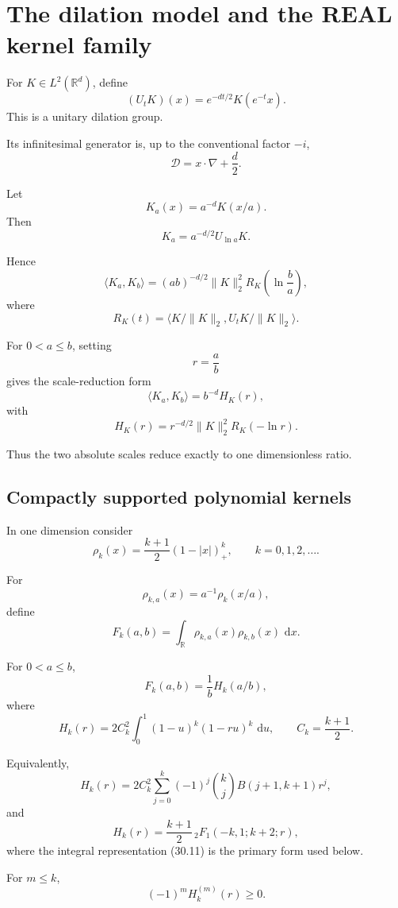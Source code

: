 \documentclass[11pt,a4paper]{article}
\newcommand{\R}{\mathbb R}
\newcommand{\1}{\mathbf 1}
\newcommand{\dd}{\,\mathrm d}
\newcommand{\ip}[2]{\langle #1,#2\rangle}
\begin{document}
\section{The dilation model and the REAL kernel family}

For \(K\in L^2(\R^d)\), define
\[
(U_tK)(x)
=
e^{-dt/2}K(e^{-t}x).
\tag{30.1}
\]
This is a unitary dilation group.

Its infinitesimal generator is, up to the conventional factor \(-i\),
\[
\boxed{
\mathcal D
=
x\cdot\nabla+\frac d2.
}
\tag{30.2}
\]

Let
\[
K_a(x)=a^{-d}K(x/a).
\tag{30.3}
\]
Then
\[
K_a
=
a^{-d/2}U_{\ln a}K.
\tag{30.4}
\]

Hence
\[
\boxed{
\ip{K_a}{K_b}
=
(ab)^{-d/2}
\|K\|_2^2
R_K\left(\ln\frac ba\right),
}
\tag{30.5}
\]
where
\[
R_K(t)
=
\ip{K/\|K\|_2}{U_tK/\|K\|_2}.
\]

For \(0<a\le b\), setting
\[
r=\frac ab
\]
gives the scale-reduction form
\[
\boxed{
\ip{K_a}{K_b}
=
b^{-d}H_K(r),
}
\tag{30.6}
\]
with
\[
H_K(r)
=
r^{-d/2}\|K\|_2^2R_K(-\ln r).
\tag{30.7}
\]

Thus the two absolute scales reduce exactly to one dimensionless ratio.


\subsection{Compactly supported polynomial kernels}

In one dimension consider
\[
\rho_k(x)
=
\frac{k+1}{2}(1-|x|)^k_+,
\qquad
k=0,1,2,\ldots.
\tag{30.8}
\]

For
\[
\rho_{k,a}(x)
=
a^{-1}\rho_k(x/a),
\]
define
\[
F_k(a,b)
=
\int_\R\rho_{k,a}(x)\rho_{k,b}(x)\,\dd x.
\tag{30.9}
\]

For \(0<a\le b\),
\[
\boxed{
F_k(a,b)
=
\frac1bH_k(a/b),
}
\tag{30.10}
\]
where
\[
H_k(r)
=
2C_k^2
\int_0^1
(1-u)^k(1-ru)^k\,\dd u,
\qquad
C_k=\frac{k+1}{2}.
\tag{30.11}
\]

Equivalently,
\[
H_k(r)
=
2C_k^2
\sum_{j=0}^{k}
(-1)^j
\binom{k}{j}
B(j+1,k+1)r^j,
\tag{30.12}
\]
and
\[
H_k(r)
=
\frac{k+1}{2}
\,{}_2F_1(-k,1;k+2;r),
\tag{30.13}
\]
where the integral representation (30.11) is the primary form
used below.

For \(m\le k\),
\[
\boxed{
(-1)^mH_k^{(m)}(r)\ge0.
}
\tag{30.14}
\]
\end{document}
